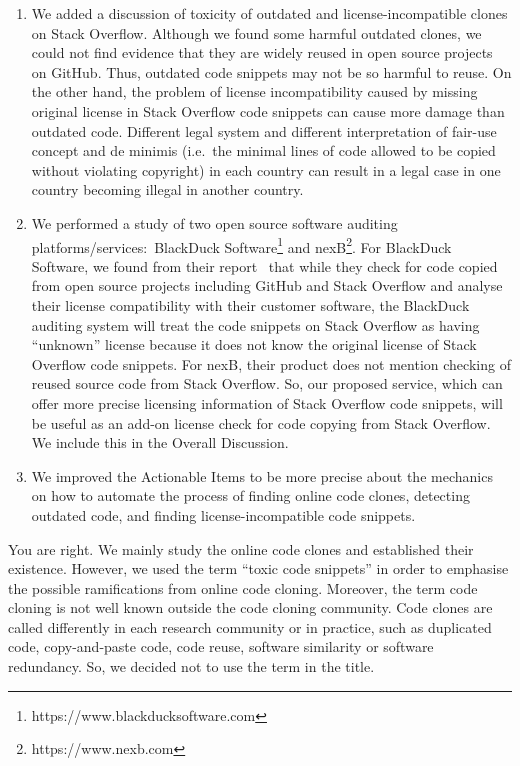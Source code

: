 \documentclass[a4paper,twoside,10pt]{reviewresponse}
\begin{document}
\begin{enumerate}
	\item We added a discussion of toxicity of outdated and license-incompatible clones on Stack Overflow. Although we found some harmful outdated clones, we could not find evidence that they are widely reused in open source projects on GitHub. Thus, outdated code snippets may not be so harmful to reuse. On the other hand, the problem of license incompatibility caused by missing original license in Stack Overflow code snippets can cause more damage than outdated code. Different legal system and different interpretation of fair-use concept and de minimis (i.e.~the minimal lines of code allowed to be copied without violating copyright) in each country can result in a legal case in one country becoming illegal in another country. 
	
	\item We performed a study of two open source software auditing
	platforms/services:~BlackDuck
	Software\footnote{https://www.blackducksoftware.com} and
	nexB\footnote{https://www.nexb.com}. For BlackDuck Software, we found from their
	report~\cite{CORSI2017} that while they check for code copied from open source
	projects including GitHub and Stack Overflow and analyse their license
	compatibility with their customer software, the BlackDuck auditing system will
	treat the code snippets on Stack Overflow as having ``unknown'' license because
	it does not know the original license of Stack Overflow code snippets. For nexB,
	their product does not mention checking of reused source code from Stack
	Overflow. So, our proposed service, which can offer more precise licensing
	information of Stack Overflow code snippets, will be useful as an add-on license
	check for code copying from Stack Overflow. We include this in the Overall Discussion.
	
	\item We improved the Actionable Items to be more precise about the mechanics on how to automate the process of finding online code clones, detecting outdated code, and finding license-incompatible code snippets.
\end{enumerate} 


You are right. We mainly study the online code clones and established their existence. However, we used the term ``toxic code snippets'' in order to emphasise the possible ramifications from online code cloning. 
Moreover, the term code cloning is not well known outside the code cloning community. Code clones are called differently in each research community or in practice, such as duplicated code, copy-and-paste code, code reuse, software similarity or software redundancy. So, we decided not to use the term in the title. 
\end{document}
